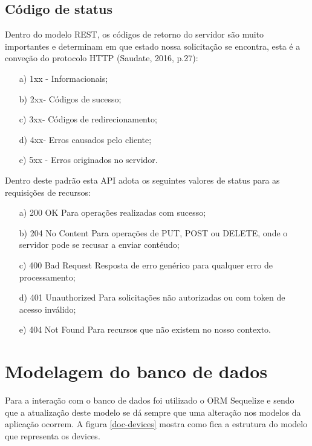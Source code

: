 \subsection{Código de status}
Dentro do modelo REST, os códigos de retorno do servidor são muito importantes e determinam em que estado nossa solicitação se encontra, esta é a conveção do protocolo HTTP (Saudate, 2016, p.27):

\begin{itemize}
    \item [a)] 1xx - Informacionais;
    \item [b)] 2xx- Códigos de sucesso;
    \item [c)] 3xx- Códigos de redirecionamento;
    \item [d)] 4xx- Erros causados pelo cliente;
    \item [e)] 5xx - Erros originados no servidor.
\end{itemize}

Dentro deste padrão esta API adota os seguintes valores de status para as requisições de recursos:

\begin{itemize}
    \item [a)] 200 OK Para operações realizadas com sucesso;
    \item [b)] 204 No Content Para operações de PUT, POST ou DELETE, onde o servidor pode se recusar a enviar contéudo;
    \item [c)] 400 Bad Request Resposta de erro genérico para qualquer erro de processamento;
    \item [d)] 401 Unauthorized Para solicitações não autorizadas ou com token de acesso inválido;
    \item [e)] 404 Not Found Para recursos que não existem no nosso contexto.
\end{itemize}

\section{Modelagem do banco de dados}
Para a interação com o banco de dados foi utilizado o ORM Sequelize e sendo que a atualização deste modelo se dá sempre que uma alteração nos modelos da aplicação ocorrem. A figura \ref{doc-devices} mostra como fica a estrutura do modelo que representa os devices.

